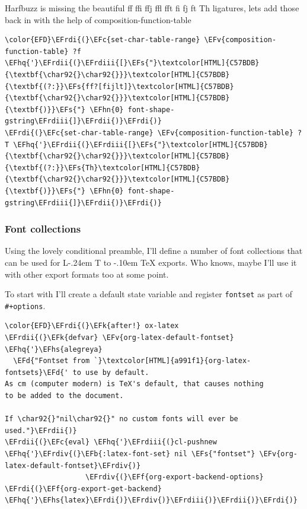\documentclass{scrartcl}
\makeatletter
\DeclareRobustCommand{\LaTeX}{L\kern-.24em%
        {\sbox\z@ T%
         \vbox to\ht\z@{\hbox{\check@mathfonts
                              \fontsize\sf@size\z@
                              \math@fontsfalse\selectfont
                              A}%
                        \vss}%
        }%
        \kern-.10em%
        \TeX}
\newcommand{\EFk}[1]{\textcolor{EFk}{#1}} %
\newcommand{\EFd}[1]{\textcolor{EFd}{#1}} %
\newcommand{\EFs}[1]{\textcolor{EFs}{#1}} %
\newcommand{\EFb}[1]{\textcolor{EFb}{#1}} %
\newcommand{\EFc}[1]{\textcolor{EFc}{#1}} %
\newcommand{\EFv}[1]{\textcolor{EFv}{#1}} %
\newcommand{\EFf}[1]{\textcolor{EFf}{#1}} %
\newcommand{\EFhn}[1]{#1} %
\newcommand{\EFhq}[1]{#1} %
\newcommand{\EFhs}[1]{#1} %
\newcommand{\EFrdi}[1]{#1} %
\newcommand{\EFrdii}[1]{#1} %
\newcommand{\EFrdiii}[1]{#1} %
\newcommand{\EFrdiv}[1]{#1} %
\makeatother
\begin{document}
Harfbuzz is missing the beautiful ff ffi ffj ffl fft fi fj ft Th ligatures,
lets add those back in with the help of composition-function-table
\begin{Code}
\begin{Verbatim}[]
\color{EFD}\EFrdi{(}\EFc{set-char-table-range} \EFv{composition-function-table} ?f \EFhq{'}\EFrdii{(}\EFrdiii{[}\EFs{"}\textcolor[HTML]{C57BDB}{\textbf{\char92{}\char92{}}}\textcolor[HTML]{C57BDB}{\textbf{(?:}}\EFs{ff?[fijlt]}\textcolor[HTML]{C57BDB}{\textbf{\char92{}\char92{}}}\textcolor[HTML]{C57BDB}{\textbf{)}}\EFs{"} \EFhn{0} font-shape-gstring\EFrdiii{]}\EFrdii{)}\EFrdi{)}
\EFrdi{(}\EFc{set-char-table-range} \EFv{composition-function-table} ?T \EFhq{'}\EFrdii{(}\EFrdiii{[}\EFs{"}\textcolor[HTML]{C57BDB}{\textbf{\char92{}\char92{}}}\textcolor[HTML]{C57BDB}{\textbf{(?:}}\EFs{Th}\textcolor[HTML]{C57BDB}{\textbf{\char92{}\char92{}}}\textcolor[HTML]{C57BDB}{\textbf{)}}\EFs{"} \EFhn{0} font-shape-gstring\EFrdiii{]}\EFrdii{)}\EFrdi{)}
\end{Verbatim}
\end{Code}

\subsubsection{Font collections}
\label{sec:org3c6f87b}
Using the lovely conditional preamble, I'll define a number of font collections
that can be used for \LaTeX{} exports. Who knows, maybe I'll use it with other
export formats too at some point.

To start with I'll create a default state variable and register \texttt{fontset} as part
of \texttt{\#+options}.

\begin{Code}
\begin{Verbatim}[]
\color{EFD}\EFrdi{(}\EFk{after!} ox-latex
\EFrdii{(}\EFk{defvar} \EFv{org-latex-default-fontset} \EFhq{'}\EFhs{alegreya}
  \EFd{"Fontset from `}\textcolor[HTML]{a991f1}{org-latex-fontsets}\EFd{' to use by default.
As cm (computer modern) is TeX's default, that causes nothing
to be added to the document.

If \char92{}"nil\char92{}" no custom fonts will ever be used."}\EFrdii{)}
\EFrdii{(}\EFc{eval} \EFhq{'}\EFrdiii{(}cl-pushnew \EFhq{'}\EFrdiv{(}\EFb{:latex-font-set} nil \EFs{"fontset"} \EFv{org-latex-default-fontset}\EFrdiv{)}
                   \EFrdiv{(}\EFf{org-export-backend-options} \EFrdi{(}\EFf{org-export-get-backend} \EFhq{'}\EFhs{latex}\EFrdi{)}\EFrdiv{)}\EFrdiii{)}\EFrdii{)}\EFrdi{)}
\end{Verbatim}
\end{Code}
\end{document}
